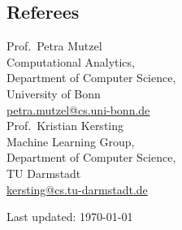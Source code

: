 \documentclass[11pt, a4paper]{scrartcl}
\begin{document}
\subsection*{Referees}
Prof.~Petra Mutzel\\
Computational Analytics,\\ 
Department of Computer Science,\\
University of Bonn \\
\href{mailto:petra.mutzel@cs.uni-bonn.de}{petra.mutzel@cs.uni-bonn.de}\\


Prof.~Kristian Kersting\\ 
Machine Learning Group,\\
Department of Computer Science,\\
TU Darmstadt\\
\href{mailto:kersting@cs.tu-darmstadt.de}{kersting@cs.tu-darmstadt.de}\\

\vfill{} 
\begin{center}
{\scriptsize Last updated: \today}
\end{center}
\end{document}
